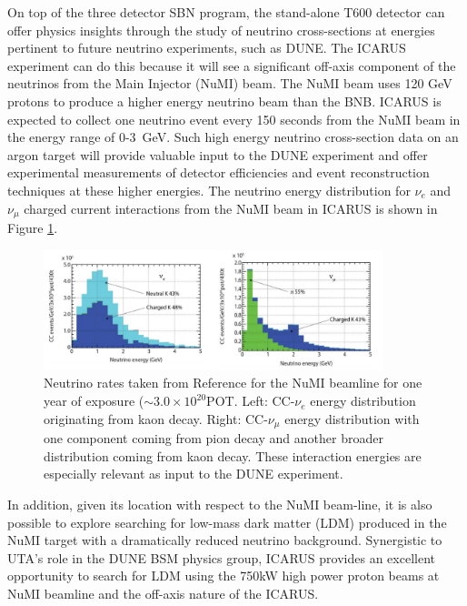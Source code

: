 On top of the three detector SBN program, the stand-alone T600 detector can offer physics insights through the study of neutrino cross-sections at energies pertinent to future neutrino experiments, such as DUNE. The ICARUS experiment can do this because it will see a significant off-axis component of the neutrinos from the Main Injector (NuMI) beam. The NuMI beam uses 120 GeV protons to produce a higher energy neutrino beam than the BNB. ICARUS is expected to collect one neutrino event every 150 seconds from the NuMI beam in the energy range of 0-3~GeV.  Such high energy neutrino cross-section data on an argon target will provide valuable input to the DUNE experiment and offer experimental measurements of detector efficiencies and event reconstruction techniques at these higher energies. The neutrino energy distribution for $\nu_{e}$ and $\nu_{\mu}$ charged current interactions from the NuMI beam in ICARUS is shown in Figure \ref{fig:NuMIICARUS}.

\begin{figure}[htb]
\centering
\includegraphics[width=0.88\textwidth]{images/ICARUS_NUMI.png}
\caption[]{Neutrino rates taken from Reference \cite{if:ICARUS} for the NuMI beamline for one year of exposure ($\sim 3.0 \times 10^{20}$POT. Left: CC-$\nu_{e}$ energy distribution originating from kaon decay. Right: CC-$\nu_{\mu}$ energy distribution with one component coming from pion decay and another broader distribution coming from kaon decay. These interaction energies are especially relevant as input to the DUNE experiment.}
\label{fig:NuMIICARUS}
\end{figure}

In addition, given its location with respect to the NuMI beam-line, it is also possible to explore searching for low-mass dark matter (LDM) produced in the NuMI target with a dramatically reduced neutrino background.  Synergistic to UTA's role in the DUNE BSM physics group, ICARUS provides an excellent opportunity to search for LDM using the 750kW high power proton beams at NuMI beamline and the off-axis nature of the ICARUS.  

%

